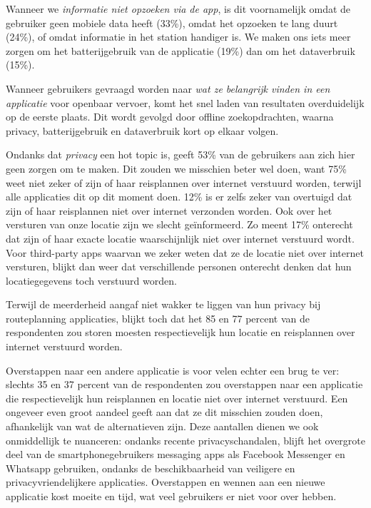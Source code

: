 Wanneer we \emph{informatie niet opzoeken via de app}, is dit voornamelijk omdat de gebruiker geen mobiele data heeft (33\%), omdat het opzoeken te lang duurt (24\%), of omdat informatie in het station handiger is. We maken ons iets meer zorgen om het batterijgebruik van de applicatie (19\%) dan om het dataverbruik (15\%).

Wanneer gebruikers gevraagd worden naar \emph{wat ze belangrijk vinden in een applicatie} voor openbaar vervoer, komt het snel laden van resultaten overduidelijk op de eerste plaats. Dit wordt gevolgd door offline zoekopdrachten, waarna privacy, batterijgebruik en dataverbruik kort op elkaar volgen.

Ondanks dat \emph{privacy} een hot topic is, geeft 53\% van de gebruikers aan zich hier geen zorgen om te maken. Dit zouden we misschien beter wel doen, want 75\% weet niet zeker of zijn of haar reisplannen over internet verstuurd worden, terwijl alle applicaties dit op dit moment doen. 12\% is er zelfs zeker van overtuigd dat zijn of haar reisplannen niet over internet verzonden worden. Ook over het versturen van onze locatie zijn we slecht geïnformeerd. Zo meent 17\% onterecht dat zijn of haar exacte locatie waarschijnlijk niet over internet verstuurd wordt. Voor third-party apps waarvan we zeker weten dat ze de locatie niet over internet versturen, blijkt dan weer dat verschillende personen onterecht denken dat hun locatiegegevens toch verstuurd worden. 

Terwijl de meerderheid aangaf niet wakker te liggen van hun privacy bij routeplanning applicaties, blijkt toch dat het 85 en 77 percent van de respondenten zou storen moesten respectievelijk hun locatie en reisplannen over internet verstuurd worden.
 
Overstappen naar een andere applicatie is voor velen echter een brug te ver: slechts 35 en 37 percent van de respondenten zou overstappen naar een applicatie die respectievelijk hun reisplannen en locatie niet over internet verstuurd. Een ongeveer even groot aandeel geeft aan dat ze dit misschien zouden doen, afhankelijk van wat de alternatieven zijn. Deze aantallen dienen we ook onmiddellijk te nuanceren: ondanks recente privacyschandalen, blijft het overgrote deel van de smartphonegebruikers messaging apps als Facebook Messenger en Whatsapp gebruiken, ondanks de beschikbaarheid van veiligere en privacyvriendelijkere applicaties. Overstappen en wennen aan een nieuwe applicatie kost moeite en tijd, wat veel gebruikers er niet voor over hebben.

